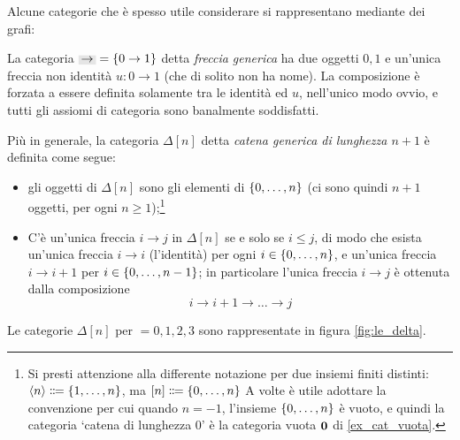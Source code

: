 Alcune categorie che è spesso utile considerare si rappresentano mediante dei grafi:
\begin{example}\label{ex_cat_freccia}
 La categoria \(\genArrow=\{0\to 1\}\) detta \emph{freccia generica} ha due oggetti \(0,1\) e un'unica freccia non identità \(u \colon 0\to 1\) (che di solito non ha nome). La composizione è forzata a essere definita solamente tra le identità ed \(u\), nell'unico modo ovvio, e tutti gli assiomi di categoria sono banalmente soddisfatti.
\end{example}
\begin{example}\label{ex_cat_catena}
 Più in generale, la categoria \(\Delta[n]\) detta \emph{catena generica di lunghezza \(n+1\)} è definita come segue:
 \begin{itemize}
  \item gli oggetti di \(\Delta[n]\) sono gli elementi di \(\{\iter[0]{n}\}\) (ci sono quindi \(n+1\) oggetti, per ogni \(n\ge 1\));\footnote{Si presti attenzione alla differente notazione per due insiemi finiti distinti: \(\bkt n \defeq  \{\iter n\}\), ma \([n] \defeq  \{\iter [0]n\}\) A volte è utile adottare la convenzione per cui quando \(n=-1\), l'insieme \(\{\iter[0]{n}\}\) è vuoto, e quindi la categoria `catena di lunghezza \(0\)' è la categoria vuota \(\mathbf{0}\) di \ref{ex_cat_vuota}.}
  \item C'è un'unica freccia \(i\to j\) in \(\Delta[n]\) se e solo se \(i\le j\), di modo che esista un'unica freccia \(i\to i\) (l'identità) per ogni \(i\in\{\iter[0]{n}\}\), e un'unica freccia \(i\to i+1\) per \(i\in\{\iter[0]{n-1}\}\); in particolare l'unica freccia \(i\to j\) è ottenuta dalla composizione
        \[i\to i+1\to\dots\to j\]
 \end{itemize}
 Le categorie \(\Delta[n]\) per \(=0,1,2,3\) sono rappresentate in figura \ref{fig:le_delta}.
 \begin{figure}[h]
  \begin{center}
\end{center}
\end{figure}
\end{example}
